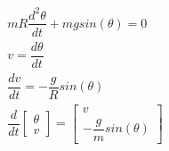 \begin{equation}
  \begin{aligned}
    m R \dfrac{d^2\theta}{dt} + mg sin(\theta)=0 \\
    v = \dfrac{d\theta}{dt}\\
    \dfrac{dv}{dt} = -\dfrac{g}{R} sin(\theta) \\
    \dfrac{d}{dt} 
    \begin{bmatrix} \theta\\  v \end{bmatrix}
    =
    \begin{bmatrix} v \\ - \dfrac{g}{m} sin(\theta) \end{bmatrix}
  \end{aligned}
\end{equation}
